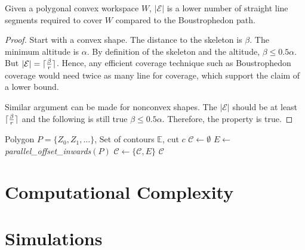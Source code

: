 \documentclass[../main.tex]{subfiles}
\begin{document}
\begin{proposition}
	Given a polygonal convex workspace $W$, $|\mathcal{E}|$ is a lower number of straight line segments required to cover $W$ compared to the Boustrophedon path.
\end{proposition}
\begin{proof}

Start with a convex shape. The distance to the skeleton is $\beta$. The minimum altitude is $\alpha$. By definition of the skeleton and the altitude, $\beta\leq 0.5\alpha$. But $|\mathcal{E}|=\lceil\frac{\beta}{r}\rceil$. Hence, any efficient coverage technique such as Boustrophedon coverage would need twice as many line for coverage, which support the claim of a lower bound.

Similar argument can be made for nonconvex shapes. The $|\mathcal{E}|$ should be at least $\lceil\frac{\beta}{r}\rceil$ and the following is still true $\beta\leq 0.5\alpha$. Therefore, the property is true.
\end{proof}

\begin{algorithm}
	\small
	\caption{$\operatorname{recalc\_encirclements}$}
	\label{alg:update_contours}
	\begin{algorithmic}[1]
		\REQUIRE Polygon $P=\{Z_0,Z_1,\ldots\}$, Set of contours $\mathbb{E}$, cut $c$
		\STATE $\mathcal{C}\gets\emptyset$ 
		\REPEAT
			\STATE $E\gets$ \textit{parallel\_offset\_inwards}$(P)$
			\STATE $\mathcal{C}\gets\{\mathcal{C},E\}$
		\RETURN $\mathcal{C}$
	\end{algorithmic}
\end{algorithm}


\section{Computational Complexity}

\section{Simulations}
\end{document}

